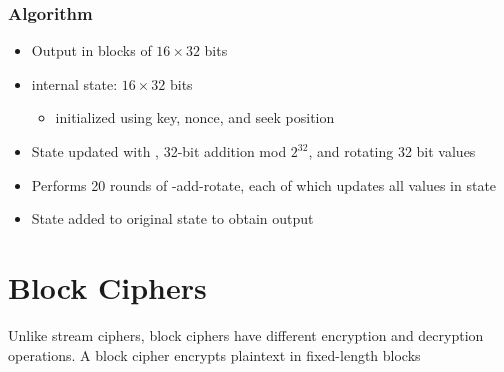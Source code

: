 \documentclass[final]{article}
\begin{document}
\subsubsection*{Algorithm}
\begin{itemize}[nosep]
    \item Output in blocks of $16\times32$ bits
    \item internal state: $16\times 32$ bits
          \begin{itemize}[nosep]\item initialized using key, nonce, and seek position\end{itemize}
    \item State updated with , 32-bit addition mod $2^{32}$, and rotating 32 bit values
    \item Performs 20 rounds of -add-rotate, each of which updates all values in state
    \item State added to original state to obtain output
\end{itemize}
\section{Block Ciphers}
Unlike \glspl{stream cipher}, \glspl{block cipher} have different encryption and decryption operations. A block cipher encrypts plaintext in fixed-length blocks
\end{document}
